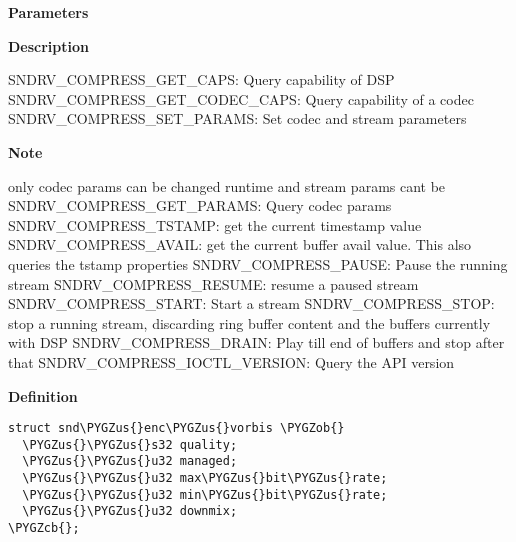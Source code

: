 \documentclass[a4paper,8pt,english]{sphinxmanual}
\def\PYGZus{\char`\_}
\def\PYGZob{\char`\{}
\def\PYGZcb{\char`\}}
\begin{document}
\begin{fulllineitems}
\label{sound/kernel-api/alsa-driver-api:c.SNDRV_COMPRESS_IOCTL_VERSION}
\end{fulllineitems}


\textbf{Parameters}

\textbf{Description}

SNDRV\_COMPRESS\_GET\_CAPS: Query capability of DSP
SNDRV\_COMPRESS\_GET\_CODEC\_CAPS: Query capability of a codec
SNDRV\_COMPRESS\_SET\_PARAMS: Set codec and stream parameters

\textbf{Note}

only codec params can be changed runtime and stream params cant be
SNDRV\_COMPRESS\_GET\_PARAMS: Query codec params
SNDRV\_COMPRESS\_TSTAMP: get the current timestamp value
SNDRV\_COMPRESS\_AVAIL: get the current buffer avail value.
This also queries the tstamp properties
SNDRV\_COMPRESS\_PAUSE: Pause the running stream
SNDRV\_COMPRESS\_RESUME: resume a paused stream
SNDRV\_COMPRESS\_START: Start a stream
SNDRV\_COMPRESS\_STOP: stop a running stream, discarding ring buffer content
and the buffers currently with DSP
SNDRV\_COMPRESS\_DRAIN: Play till end of buffers and stop after that
SNDRV\_COMPRESS\_IOCTL\_VERSION: Query the API version

\begin{fulllineitems}
\label{sound/kernel-api/alsa-driver-api:c.snd_enc_vorbis}
\end{fulllineitems}


\textbf{Definition}

\begin{Verbatim}[commandchars=\\\{\}]
struct snd\PYGZus{}enc\PYGZus{}vorbis \PYGZob{}
  \PYGZus{}\PYGZus{}s32 quality;
  \PYGZus{}\PYGZus{}u32 managed;
  \PYGZus{}\PYGZus{}u32 max\PYGZus{}bit\PYGZus{}rate;
  \PYGZus{}\PYGZus{}u32 min\PYGZus{}bit\PYGZus{}rate;
  \PYGZus{}\PYGZus{}u32 downmix;
\PYGZcb{};
\end{Verbatim}
\end{document}
